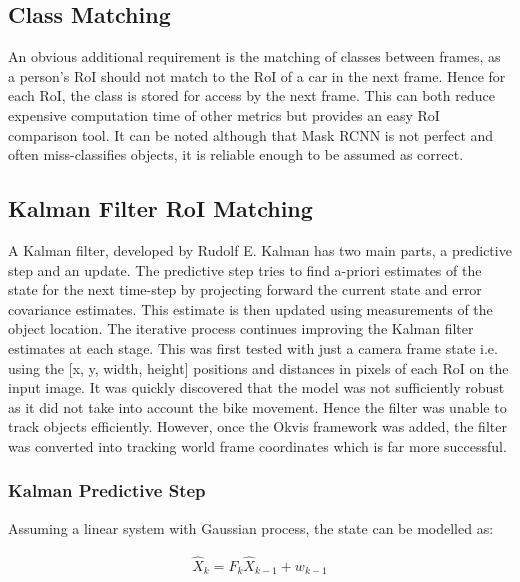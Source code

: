 \documentclass[11pt,twoside]{report}
\begin{document}
\subsection{Class Matching} \label{class_matching}
An obvious additional requirement is the matching of classes between frames, as a person's RoI should not match to the RoI of a car in the next frame. Hence for each RoI, the class is stored for access by the next frame. This can both reduce expensive computation time of other metrics but provides an easy RoI comparison tool. It can be noted although that Mask RCNN is not perfect and often miss-classifies objects, it is reliable enough to be assumed as correct.

\subsection{Kalman Filter RoI Matching} \label{kalman_matching}

A Kalman filter, developed by Rudolf E. Kalman has two main parts, a predictive step and an update. The predictive step tries to find a-priori estimates of the state for the next time-step by projecting forward the current state and error covariance estimates. This estimate is then updated using measurements of the object location. The iterative process continues improving the Kalman filter estimates at each stage. 
\newline \newline
This was first tested with just a camera frame state i.e. using the [x, y, width, height] positions and distances in pixels of each RoI on the input image. It was quickly discovered that the model was not sufficiently robust as it did not take into account the bike movement. Hence the filter was unable to track objects efficiently. However, once the Okvis framework was added, the filter was converted into tracking world frame coordinates which is far more successful.

\subsubsection{Kalman Predictive Step}
Assuming a linear system with Gaussian process, the state can be modelled as:

\begin{equation}
\begin{aligned}
\hat{X}_{k} =  F_{k} \hat{X}_{k-1} + w_{k-1}
\end{aligned}
\end{equation}
\end{document}
